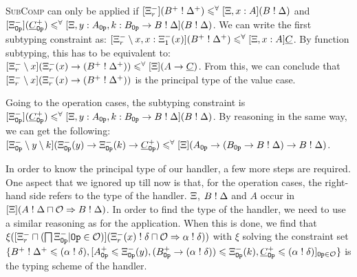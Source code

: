 
\textsc{SubComp} can only be applied if $[\Xi^-_r](B^+ \mathrel{!} \Delta^+) \leqslant^\forall [\Xi, x \mathrel{:} A](B \mathrel{!} \Delta)$ and $[\Xi^-_{\mathtt{Op}}](\underline{C}^+_{\mathtt{Op}}) \leqslant^\forall [\Xi, y \mathrel{:} A_{\mathtt{Op}}, k \mathrel{:} B_{\mathtt{Op}} \to B \mathrel{!} \Delta](B \mathrel{!} \Delta)$. We can write the first subtyping constraint as: $[\Xi_r^-\setminus x, x : \Xi_1^-(x)](B^+ \mathrel{!} \Delta^+) \leqslant^\forall [\Xi, x:A]\underline{C}$. By function subtyping, this has to be equivalent to: $[\Xi_r^-\setminus x](\Xi_r^-(x) \to (B^+ \mathrel{!} \Delta^+)) \leqslant^\forall [\Xi](A \to \underline{C})$. From this, we can conclude that $[\Xi_r^-\setminus x](\Xi_r^-(x) \to (B^+ \mathrel{!} \Delta^+))$ is the principal type of the value case.

Going to the operation cases, the subtyping constraint is $[\Xi^-_{\mathtt{Op}}](\underline{C}^+_{\mathtt{Op}}) \leqslant^\forall [\Xi, y \mathrel{:} A_{\mathtt{Op}}, k \mathrel{:} B_{\mathtt{Op}} \to B \mathrel{!} \Delta](B \mathrel{!} \Delta)$. By reasoning in the same way, we can get the following: $[\Xi^-_{\mathtt{Op}} \setminus y \setminus k](\Xi_{\mathtt{Op}}^-(y) \to \Xi_{\mathtt{Op}}^-(k) \to \underline{C}^+_{\mathtt{Op}}) \leqslant^\forall [\Xi](A_{\mathtt{Op}} \to (B_{\mathtt{Op}} \to B \mathrel{!} \Delta) \to B \mathrel{!} \Delta)$. 

In order to know the principal type of our handler, a few more steps are required. One aspect that we ignored up till now is that, for the operation cases, the right-hand side refers to the type of the handler. $\Xi$, $B \mathrel{!} \Delta$ and $A$ occur in $[\Xi](A \mathrel{!} \Delta \sqcap \mathcal{O} \Rightarrow B \mathrel{!} \Delta)$. In order to find the type of the handler, we need to use a similar reasoning as for the application. When this is done, we find that $\xi([\Xi^-_r \sqcap (\bigsqcap \Xi^-_{\mathtt{Op}} | \mathtt{Op} \in \mathcal{O})](\Xi_r^-(x) \mathrel{!} \delta \sqcap \mathcal{O} \Rightarrow \alpha \mathrel{!} \delta))$ with $\xi$ solving the constraint set $\{B^+ \mathrel{!} \Delta^+ \leqslant (\alpha \mathrel{!} \delta), [A^+_{\mathtt{Op}} \leqslant \Xi_{\mathtt{Op}}^-(y), (B^+_{\mathtt{Op}} \to (\alpha \mathrel{!} \delta)) \leqslant \Xi_{\mathtt{Op}}^-(k), \underline{C}^+_{\mathtt{Op}} \leqslant (\alpha \mathrel{!} \delta)]_{\mathtt{Op} \in \mathcal{O}}\}$ is the typing scheme of the handler.

